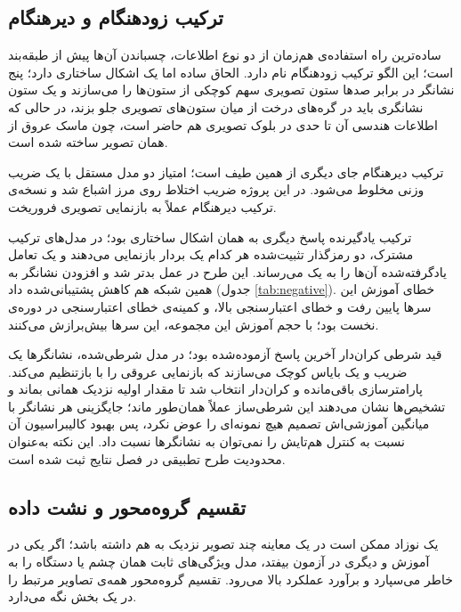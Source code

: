 \subsection{ترکیب زودهنگام و دیرهنگام}

ساده‌ترین راه استفاده‌ی هم‌زمان از دو نوع اطلاعات، چسباندن آن‌ها پیش از طبقه‌بند است؛ این الگو ترکیب زودهنگام نام دارد. الحاق ساده اما یک اشکال ساختاری دارد؛ پنج نشانگر در برابر صدها ستون تصویری سهم کوچکی از ستون‌ها را می‌سازند و یک ستون نشانگری باید در گره‌های درخت از میان ستون‌های تصویری جلو بزند، در حالی که اطلاعات هندسی آن تا حدی در بلوک تصویری هم حاضر است، چون ماسک عروق از همان تصویر ساخته شده است.

ترکیب دیرهنگام جای دیگری از همین طیف است؛ امتیاز دو مدل مستقل با یک ضریب وزنی مخلوط می‌شود. در این پروژه ضریب اختلاط روی مرز اشباع شد و نسخه‌ی ترکیب دیرهنگام عملاً به بازنمایی تصویری فروریخت.

ترکیب یادگیرنده پاسخ دیگری به همان اشکال ساختاری بود؛ در مدل‌های ترکیب مشترک، دو رمزگذار تثبیت‌شده هر کدام یک بردار بازنمایی می‌دهند و یک تعامل یادگرفته‌شده آن‌ها را به یک  می‌رساند. این طرح در عمل بدتر شد و افزودن نشانگر به همین شبکه هم کاهش پشتیبانی‌شده داد (جدول \autoref{tab:negative}). خطای آموزش این سرها پایین رفت و خطای اعتبارسنجی بالا، و کمینه‌ی خطای اعتبارسنجی در دوره‌ی نخست بود؛ با حجم آموزش این مجموعه، این سرها بیش‌برازش می‌کنند.

قید شرطی کران‌دار آخرین پاسخ آزموده‌شده بود؛ در مدل شرطی‌شده، نشانگرها یک ضریب و یک بایاس کوچک می‌سازند که بازنمایی عروقی را با  بازتنظیم می‌کند. پارامترسازی باقی‌مانده و کران‌دار انتخاب شد تا مقدار اولیه نزدیک همانی بماند و تشخیص‌ها نشان می‌دهند این شرطی‌ساز عملاً همان‌طور ماند؛ جایگزینی هر نشانگر با میانگین آموزشی‌اش تصمیم هیچ نمونه‌ای را عوض نکرد، پس بهبود کالیبراسیون آن نسبت به کنترل هم‌تایش را نمی‌توان به نشانگرها نسبت داد. این نکته به‌عنوان محدودیت طرح تطبیقی در فصل نتایج ثبت شده است.

\subsection{تقسیم گروه‌محور و نشت داده}

یک نوزاد ممکن است در یک معاینه چند تصویر نزدیک به هم داشته باشد؛ اگر یکی در آموزش و دیگری در آزمون بیفتد، مدل ویژگی‌های ثابت همان چشم یا دستگاه را به خاطر می‌سپارد و برآورد عملکرد بالا می‌رود. تقسیم گروه‌محور همه‌ی تصاویر مرتبط را در یک بخش نگه می‌دارد.

